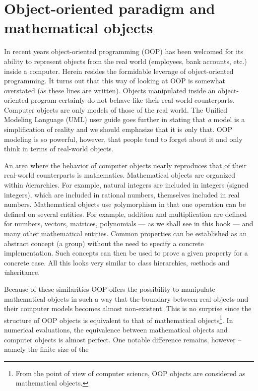 \section{Object-oriented paradigm and mathematical objects}
In recent years object-oriented programming (OOP) has been welcomed for its
ability to represent objects from the real world (employees, bank accounts,
etc.) inside a computer.
Herein resides the formidable leverage of object-oriented
programming.
It turns out that this way of looking at OOP is somewhat overstated (as these
lines are written).
Objects manipulated inside an object-oriented program certainly do not
behave like their real world counterparts. Computer objects are
only models of those of the real world. The Unified Modeling Language (UML) user
guide goes further in stating that {\textit a model is a simplification of
reality} and we should emphasize that it is {\textsl only that}. OOP
modeling is so powerful, however, that people tend to forget about
it and only think in terms of real-world objects.
\par
An area where the behavior of computer objects nearly reproduces
that of their real-world counterparts is mathematics. Mathematical
objects are organized within {\textit hierarchies}. For example,
natural integers are included in integers (signed integers), which
are included in rational numbers, themselves included in real
numbers. Mathematical objects use {\textit polymorphism} in that one
operation can be defined on several entities. For example,
addition and multiplication are defined for numbers, vectors,
matrices, polynomials --- as we shall see in this book --- and
many other mathematical entities. Common properties can be
established as an abstract concept (\eg a group) without the
need to specify a concrete implementation. Such concepts can then
be used to prove a given property for a concrete case. All this
looks very similar to {\textsl class hierarchies}, {\textsl methods} and
{\textsl inheritance}.
\par
Because of these similarities OOP offers the possibility to
manipulate mathematical objects in such a way that the boundary
between real objects and their computer models becomes almost
non-existent. This is no surprise since the structure of OOP
objects is equivalent to that of mathematical
objects\footnote{From the point of view of computer science, OOP
objects are considered as mathematical objects.}. In numerical evaluations,
the equivalence between mathematical
objects and computer objects is almost perfect. One notable
difference remains, however -- namely the finite size of the
